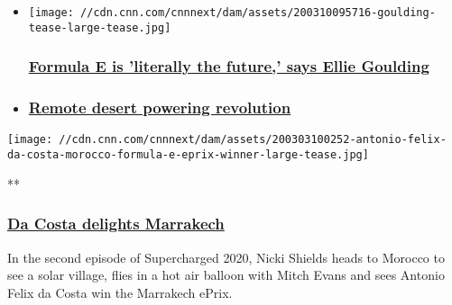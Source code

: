 \begin{itemize}
\item
  \href{/2020/03/10/motorsport/ellie-goulding-formula-e-supercharged-spt-intl/index.html}{}

  \texttt{[image: //cdn.cnn.com/cnnnext/dam/assets/200310095716-goulding-tease-large-tease.jpg]}

  \hypertarget{formula-e-is-literally-the-future-says-ellie-goulding}{%
  \subsubsection{\texorpdfstring{\href{/2020/03/10/motorsport/ellie-goulding-formula-e-supercharged-spt-intl/index.html}{Formula
  E is 'literally the future,' says Ellie
  Goulding}}{Formula E is 'literally the future,' says Ellie Goulding}}\label{formula-e-is-literally-the-future-says-ellie-goulding}}
\item
  \hypertarget{remote-desert-powering-revolution}{%
  \subsubsection{\texorpdfstring{\href{/2020/02/10/motorsport/formula-e-lithium-mining-spt-intl/index.html}{Remote
  desert powering
  revolution}}{Remote desert powering revolution}}\label{remote-desert-powering-revolution}}
\end{itemize}

\href{/videos/sports/2020/03/06/marrakech-eprix-morocco-stoffel-vandoorne-ellie-goulding-supercharged-vision-spt-intl.cnn}{}

\texttt{[image: //cdn.cnn.com/cnnnext/dam/assets/200303100252-antonio-felix-da-costa-morocco-formula-e-eprix-winner-large-tease.jpg]}

**

\hypertarget{da-costa-delights-marrakech}{%
\subsubsection{\texorpdfstring{\href{/videos/sports/2020/03/06/marrakech-eprix-morocco-stoffel-vandoorne-ellie-goulding-supercharged-vision-spt-intl.cnn}{Da
Costa delights
Marrakech}}{Da Costa delights Marrakech}}\label{da-costa-delights-marrakech}}

In the second episode of Supercharged 2020, Nicki Shields heads to
Morocco to see a solar village, flies in a hot air balloon with Mitch
Evans and sees Antonio Felix da Costa win the Marrakech ePrix.

